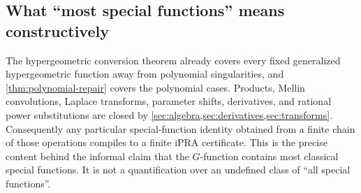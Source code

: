\subsection{What ``most special functions'' means constructively}

The hypergeometric conversion theorem already covers every fixed generalized
hypergeometric function away from polynomial singularities, and
\cref{thm:polynomial-repair} covers the polynomial cases.  Products, Mellin
convolutions, Laplace transforms, parameter shifts, derivatives, and rational
power substitutions are closed by \cref{sec:algebra,sec:derivatives,sec:transforms}.
Consequently any particular special-function identity obtained from a finite
chain of those operations compiles to a finite iPRA certificate.  This is the
precise content behind the informal claim that the $G$-function contains most
classical special functions.  It is not a quantification over an undefined
class of ``all special functions''.

